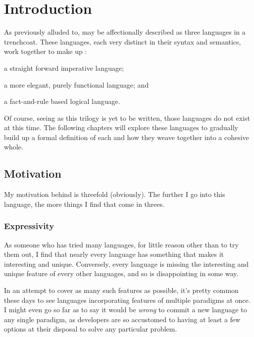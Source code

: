 \section{Introduction}

As previously alluded to, \Trilogy{} may be affectionally  described
as three languages in a trenchcoat. These languages, each very distinct in
their syntax and semantics, work together to make up \Trilogy{}:

\begin{description}[labelindent=1.5em]
    \item[Prose] a straight forward imperative language;
    \item[Poetry] a more elegant, purely functional language; and
    \item[Law] a fact-and-rule based logical language.
\end{description}

\noindent
Of course, seeing as this trilogy is yet to be written, those languages do not
exist at this time. The following chapters will explore these languages to
gradually build up a formal definition of each and how they weave together
into a cohesive whole.

\subsection{Motivation}

My motivation behind \Trilogy{} is threefold (obviously). The further I go
into this language, the more things I find that come in threes.

\subsubsection{Expressivity}

As someone who has tried many languages, for little reason other than
to try them out, I find that nearly every language has something that
makes it interesting and unique. Conversely, every language is missing
the interesting and unique feature of every other languages, and so
is disappointing in some way.

In an attempt to cover as many such features as possible, it's pretty common these
days to see languages incorporating features of multiple paradigms at once. I might even
go so far as to say it would be \emph{wrong} to commit a new language to
any single paradigm, as developers are so accustomed to having at least a few
options at their disposal to solve any particular problem.

